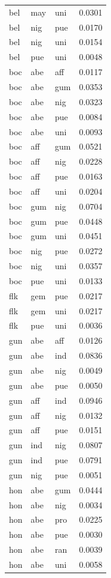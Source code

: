 \begin{tabular}{lllr}
bel & may & uni & 0.0301\\
bel & nig & pue & 0.0170\\
bel & nig & uni & 0.0154\\
bel & pue & uni & 0.0048\\
boc & abe & aff & 0.0117\\
\addlinespace
boc & abe & gum & 0.0353\\
boc & abe & nig & 0.0323\\
boc & abe & pue & 0.0084\\
boc & abe & uni & 0.0093\\
boc & aff & gum & 0.0521\\
\addlinespace
boc & aff & nig & 0.0228\\
boc & aff & pue & 0.0163\\
boc & aff & uni & 0.0204\\
boc & gum & nig & 0.0704\\
boc & gum & pue & 0.0448\\
\addlinespace
boc & gum & uni & 0.0451\\
boc & nig & pue & 0.0272\\
boc & nig & uni & 0.0357\\
boc & pue & uni & 0.0133\\
flk & gem & pue & 0.0217\\
\addlinespace
flk & gem & uni & 0.0217\\
flk & pue & uni & 0.0036\\
gun & abe & aff & 0.0126\\
gun & abe & ind & 0.0836\\
gun & abe & nig & 0.0049\\
\addlinespace
gun & abe & pue & 0.0050\\
gun & aff & ind & 0.0946\\
gun & aff & nig & 0.0132\\
gun & aff & pue & 0.0151\\
gun & ind & nig & 0.0807\\
\addlinespace
gun & ind & pue & 0.0791\\
gun & nig & pue & 0.0051\\
hon & abe & gum & 0.0444\\
hon & abe & nig & 0.0034\\
hon & abe & pro & 0.0225\\
\addlinespace
hon & abe & pue & 0.0030\\
hon & abe & ran & 0.0039\\
hon & abe & uni & 0.0058\\

\end{tabular}
